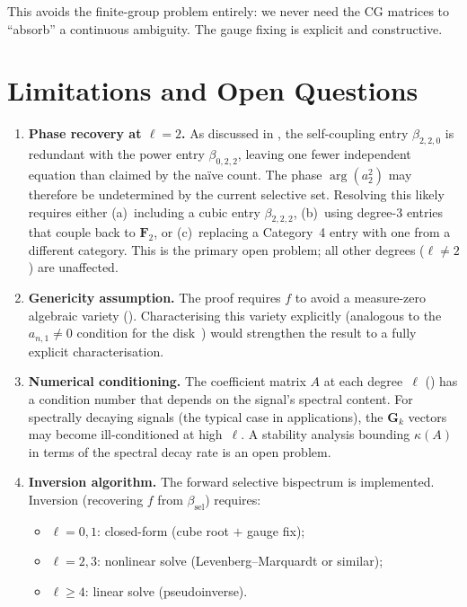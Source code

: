 \documentclass{article}
\theoremstyle{plain}
\theoremstyle{definition}
\theoremstyle{remark}
\begin{document}
\noindent
This avoids the finite-group problem entirely: we never need the CG
matrices to ``absorb'' a continuous ambiguity. The gauge fixing is
explicit and constructive.


\section{Limitations and Open Questions}\label{sec:limitations}

\begin{enumerate}
  \item \textbf{Phase recovery at $\ell = 2$.}
    As discussed in , the self-coupling entry
    $\beta_{2,2,0}$ is redundant with the power entry $\beta_{0,2,2}$,
    leaving one fewer independent equation than claimed by the na\"ive
    count. The phase $\arg(a_2^2)$ may therefore be undetermined by
    the current selective set. Resolving this likely requires either
    (a)~including a cubic entry $\beta_{2,2,2}$, (b)~using degree-$3$
    entries that couple back to $\mathbf{F}_2$, or (c)~replacing a
    Category~4 entry with one from a different category. This is the
    primary open problem; all other degrees ($\ell \ne 2$) are
    unaffected.

  \item \textbf{Genericity assumption.}
    The proof requires $f$ to avoid a measure-zero algebraic variety
    (). Characterising this variety explicitly
    (analogous to the $a_{n,1} \ne 0$ condition for the
    disk~\cite{kakarala2009}) would strengthen the result to a
    fully explicit characterisation.

  \item \textbf{Numerical conditioning.}
    The coefficient matrix $A$ at each degree~$\ell$
    () has a condition number that depends
    on the signal's spectral content. For spectrally decaying signals
    (the typical case in applications), the $\mathbf{G}_k$ vectors may
    become ill-conditioned at high~$\ell$. A stability analysis bounding
    $\kappa(A)$ in terms of the spectral decay rate is an open problem.

  \item \textbf{Inversion algorithm.}
    The forward selective bispectrum is implemented. Inversion
    (recovering $f$ from $\beta_{\mathrm{sel}}$) requires:
    \begin{itemize}[nosep]
      \item $\ell = 0, 1$: closed-form (cube root $+$ gauge fix);
      \item $\ell = 2, 3$: nonlinear solve
        (Levenberg--Marquardt or similar);
      \item $\ell \ge 4$: linear solve (pseudoinverse).
    \end{itemize}
\end{enumerate}
\end{document}
